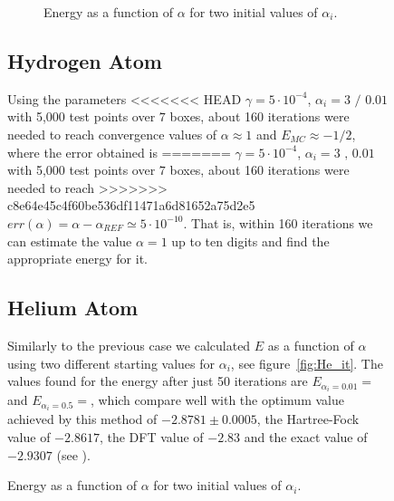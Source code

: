 \begin{figure}
\begin{figure}[th]
\begin{center}
		\caption{
			Energy as a function of $\alpha$ for two initial values of $\alpha_i$.
		}
		\label{fig:Ho_rel}
	\end{center}
\end{figure}


\subsection{Hydrogen Atom}
Using the parameters
<<<<<<< HEAD
$\gamma = 5\cdot 10^{-4}$, $\alpha_i = 3 \text{~/~}0.01$ with 5,000
test points over $7$ boxes, about 160 iterations were needed to reach convergence
values of $\alpha \approx 1$ and $E_{MC} \approx - 1/2$, where the error obtained is
=======
$\gamma = 5\cdot 10^{-4}$, $\alpha_i = 3 \text{~,~}0.01$ with 5,000
test points over $7$ boxes, about 160 iterations were needed to reach
>>>>>>> c8e64e45c4f60be536df11471a6d81652a75d2e5
$err(\alpha) = \alpha-\alpha_{REF} \simeq 5 \cdot 10^{-10}$. That is, within 160
iterations we can estimate the value $\alpha=1$ up to ten digits and find the appropriate energy for it.


\subsection{Helium Atom}

Similarly to the previous case we calculated $E$ as a function of $\alpha$
using two different starting values for $\alpha_i$, see figure~\ref{fig:He_it}.
The values found for the energy after just 50 iterations are
$E_{\alpha_i = 0.01} =  $ and $E_{\alpha_i = 0.5} =  $, which
compare well with the optimum value achieved by this method
of $-2.8781 \pm 0.0005$, the Hartree-Fock value of $-2.8617$,
the DFT value of $-2.83$ and the exact value of $-2.9307$ (see \cite{JosBook}). %


\end{figure}
